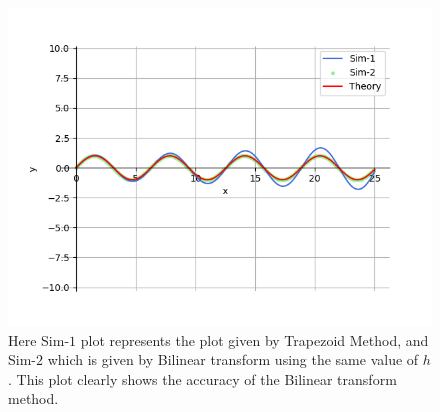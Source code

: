 \documentclass[journal]{IEEEtran}
\begin{document}
\begin{figure}[h!]
    \centering
    \includegraphics[width=0.7\columnwidth]{figs/graph.png}
    \caption{Here Sim-$1$ plot represents the plot given by Trapezoid Method, and Sim-$2$ which is given by Bilinear transform using the same value of $h$. This plot clearly shows the accuracy of the Bilinear transform method.}
    \label{label}
\end{figure}
\end{document}
